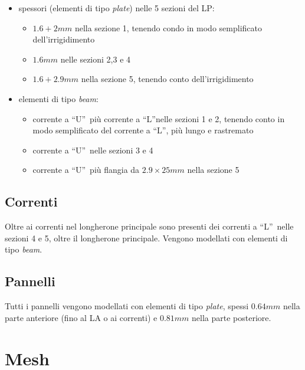\documentclass[
10pt, %
a4paper, %
oneside, %
headinclude,footinclude, %
BCOR5mm, %
]{scrartcl}
\begin{document}
\begin{itemize}
	\item spessori (elementi di tipo \emph{plate}) nelle 5 sezioni del LP:
	\begin{itemize}
		\item $1.6+2mm$ nella sezione 1, tenendo condo in modo semplificato dell'irrigidimento
		\item $1.6mm$ nelle sezioni 2,3 e 4
		\item $1.6+2.9mm$ nella sezione 5, tenendo conto dell'irrigidimento
	\end{itemize}
	\item elementi di tipo \emph{beam}:
	\begin{itemize}
		\item corrente a \textquotedblleft U\textquotedblright \ più corrente a \textquotedblleft L\textquotedblright nelle sezioni 1 e 2, tenendo conto in modo semplificato del corrente a \textquotedblleft L\textquotedblright, più lungo e rastremato
		\item corrente a \textquotedblleft U\textquotedblright \ nelle sezioni 3 e 4
		\item corrente a \textquotedblleft U\textquotedblright \ più flangia da $2.9 \times 25 mm$ nella sezione 5
	\end{itemize}
\end{itemize}


\subsection{Correnti}

Oltre ai correnti nel longherone principale sono presenti dei correnti a \textquotedblleft L\textquotedblright \ nelle sezioni 4 e 5, oltre il longherone principale. Vengono modellati con elementi di tipo \emph{beam}.

\subsection{Pannelli}

Tutti i pannelli vengono modellati con elementi di tipo \emph{plate}, spessi $0.64mm$ nella parte anteriore (fino al LA o ai correnti) e $0.81mm$ nella parte posteriore. 


\newpage

\section{Mesh}
\end{document}

